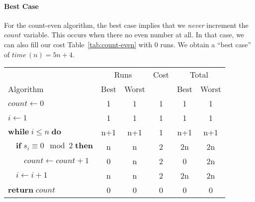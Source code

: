 \documentclass{aldast}
\begin{document}
\paragraph{Best Case} For the count-even algorithm, the best case
implies that we \emph{never} increment the $count$ variable. This
occurs when there no even number at all. In that case, we can also
fill our cost Table~\ref{tab:count-even} with 0 runs. We obtain a
``best case'' of $time\,(n)=5n+4$.

\begin{table}[htbp]
  \begin{center}
    \begin{tabular}{lcc c cc}
      \toprule
                                                                 & \multicolumn{2}{c}{Runs} & Cost                               & \multicolumn{2}{c}{Total} \\
      \cmidrule(r){2-3}
      \cmidrule(r){5-6}
      Algorithm                                                  & Best                     & Worst                              &        & Best & Worst     \\
      \midrule
      $count \gets 0$                                            & 1                        & 1                                  & 1      & 1    & 1         \\
      $i \gets 1$                                                & 1                        & 1                                  & 1      & 1    & 1         \\
      $\mathbf{while} \; i \leq n \; \mathbf{do}$                & n+1                      & n+1                                & 1      & n+1  & n+1       \\
      $\quad \mathbf{if}\; s_i \equiv 0 \mod 2 \; \mathbf{then}$ & n                        & n                                  & 2      & 2n   & 2n        \\
      $\quad\quad count \gets count + 1$                         & 0                        & n                                  & 2      & 0    & 2n        \\
      $\quad i \gets i + 1$                                      & n                        & n                                  & 2      & 2n   & 2n        \\
      $\mathbf{return} \; count$                                 & 0                        & 0                                  & 0      & 0    & 0         \\ 

\end{tabular}
\end{center}
\end{table}
\end{document}
